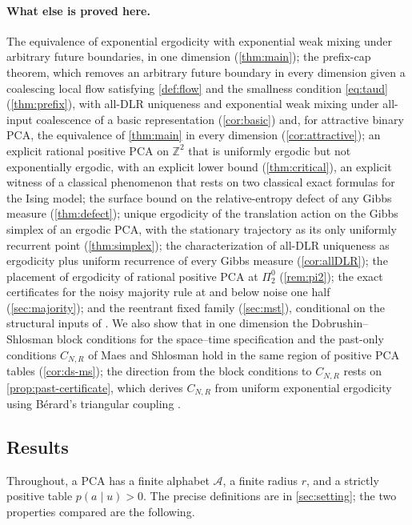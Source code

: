\documentclass[11pt]{article}
\theoremstyle{plain}
\theoremstyle{definition}
\theoremstyle{remark}
\newcommand{\A}{\mathcal{A}}
\newcommand{\Z}{\mathbb{Z}}
\begin{document}
\paragraph{What else is proved here.} The equivalence of exponential ergodicity with exponential weak mixing under arbitrary future boundaries, in one dimension (\cref{thm:main}); the prefix-cap theorem, which removes an arbitrary future boundary in every dimension given a coalescing local flow satisfying \cref{def:flow} and the smallness condition \eqref{eq:taud} (\cref{thm:prefix}), with all-DLR uniqueness and exponential weak mixing under all-input coalescence of a basic representation (\cref{cor:basic}) and, for attractive binary PCA, the equivalence of \cref{thm:main} in every dimension (\cref{cor:attractive}); an explicit rational positive PCA on $\Z^2$ that is uniformly ergodic but not exponentially ergodic, with an explicit lower bound (\cref{thm:critical}), an explicit witness of a classical phenomenon that rests on two classical exact formulas for the Ising model; the surface bound on the relative-entropy defect of any Gibbs measure (\cref{thm:defect}); unique ergodicity of the translation action on the Gibbs simplex of an ergodic PCA, with the stationary trajectory as its only uniformly recurrent point (\cref{thm:simplex}); the characterization of all-DLR uniqueness as ergodicity plus uniform recurrence of every Gibbs measure (\cref{cor:allDLR}); the placement of ergodicity of rational positive PCA at $\Pi^0_2$ (\cref{rem:pi2}); the exact certificates for the noisy majority rule at and below noise one half (\cref{sec:majority}); and the reentrant fixed family (\cref{sec:mst}), conditional on the structural inputs of \cite{MST26}. We also show that in one dimension the Dobrushin--Shlosman block conditions for the space--time specification and the past-only conditions $C_{N,R}$ of Maes and Shlosman hold in the same region of positive PCA tables (\cref{cor:ds-ms}); the direction from the block conditions to $C_{N,R}$ rests on \cref{prop:past-certificate}, which derives $C_{N,R}$ from uniform exponential ergodicity using B\'erard's triangular coupling \cite[Lemma~8]{Berard23}.

\subsection{Results}

Throughout, a PCA has a finite alphabet $\A$, a finite radius $r$, and a strictly positive table $p(a\mid u)>0$. The precise definitions are in \cref{sec:setting}; the two properties compared are the following.
\end{document}
